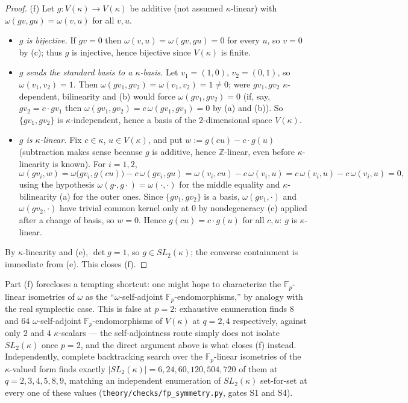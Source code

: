 \begin{proof}
(f) Let $g:V(\kappa)\to V(\kappa)$ be additive (not assumed $\kappa$-linear)
with $\omega(gv,gu)=\omega(v,u)$ for all $v,u$.
\begin{itemize}
\item \emph{$g$ is bijective.} If $gv=0$ then $\omega(v,u)=\omega(gv,gu)=0$
for every $u$, so $v=0$ by (c); thus $g$ is injective, hence bijective since
$V(\kappa)$ is finite.
\item \emph{$g$ sends the standard basis to a $\kappa$-basis.} Let
$v_1=(1,0)$, $v_2=(0,1)$, so $\omega(v_1,v_2)=1$. Then
$\omega(gv_1,gv_2)=\omega(v_1,v_2)=1\neq 0$; were $gv_1,gv_2$
$\kappa$-dependent, bilinearity and (b) would force $\omega(gv_1,gv_2)=0$
(if, say, $gv_2=c\cdot gv_1$ then $\omega(gv_1,gv_2)=c\,\omega(gv_1,gv_1)=0$
by (a) and (b)). So $\{gv_1,gv_2\}$ is $\kappa$-independent, hence a basis of
the $2$-dimensional space $V(\kappa)$.
\item \emph{$g$ is $\kappa$-linear.} Fix $c\in\kappa$, $u\in V(\kappa)$, and
put $w := g(cu) - c\cdot g(u)$ (subtraction makes sense because $g$ is
additive, hence $\mathbb{Z}$-linear, even before $\kappa$-linearity is
known). For $i=1,2$,
\[
\omega(gv_i,w) = \omega\big(gv_i,g(cu)\big) - c\,\omega(gv_i,gu)
= \omega(v_i,cu) - c\,\omega(v_i,u) = c\,\omega(v_i,u)-c\,\omega(v_i,u) = 0,
\]
using the hypothesis $\omega(g\cdot,g\cdot)=\omega(\cdot,\cdot)$ for the
middle equality and $\kappa$-bilinearity (a) for the outer ones. Since
$\{gv_1,gv_2\}$ is a basis, $\omega(gv_1,\cdot)$ and $\omega(gv_2,\cdot)$ have
trivial common kernel only at $0$ by nondegeneracy (c) applied after a change
of basis, so $w=0$. Hence $g(cu)=c\cdot g(u)$ for all $c,u$: $g$ is
$\kappa$-linear.
\end{itemize}
By $\kappa$-linearity and (e), $\det g = 1$, so $g\in SL_2(\kappa)$; the
converse containment is immediate from (e). This closes (f).
\end{proof}

\begin{remark}
Part (f) forecloses a tempting shortcut: one might hope to characterize the
$\mathbb{F}_p$-linear isometries of $\omega$ as the ``$\omega$-self-adjoint
$\mathbb{F}_p$-endomorphisms,'' by analogy with the real symplectic case.
This is false at $p=2$: exhaustive enumeration finds $8$ and $64$
$\omega$-self-adjoint $\mathbb{F}_p$-endomorphisms of $V(\kappa)$ at $q=2,4$
respectively, against only $2$ and $4$ $\kappa$-scalars — the self-adjointness
route simply does not isolate $SL_2(\kappa)$ once $p=2$, and the direct
argument above is what closes (f) instead. Independently, complete
backtracking search over the $\mathbb{F}_p$-linear isometries of the
$\kappa$-valued form finds exactly $|SL_2(\kappa)| = 6,24,60,120,504,720$ of
them at $q=2,3,4,5,8,9$, matching an independent enumeration of $SL_2(\kappa)$
set-for-set at every one of these values (\texttt{theory\slash{}checks\slash{}fp\_symmetry.py},
gates S1 and S4).
\end{remark}

